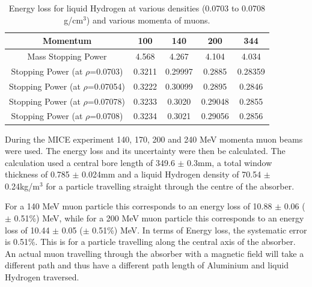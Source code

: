\begin{table}
  \caption{
    Energy loss for liquid Hydrogen at various densities (0.0703 to 0.0708 g/cm${}^{3}$) and various momenta of muons.
  }
  \label{tab:Hydrogen}
  \begin{center}
    \begin{tabular}{|c c c c c|}
    \hline

Momentum & 100 & 140 & 200 & 344     \rule{0pt}{14pt} \\
\hline
{Mass Stopping Power} & 4.568 & 4.267 & 4.104 & 4.034 \\
{Stopping Power }(at $\rho$=0.0703)\textbf{} & 0.3211 & 0.29997 & 0.2885 & 0.28359\\
{Stopping Power }(at $\rho$=0.07054)\textbf{} & 0.3222 & 0.30099 & 0.2895 & 0.2846 \\
{Stopping Power }(at $\rho$=0.07078)\textbf{} & 0.3233 & 0.3020 & 0.29048 & 0.2855 \\
{Stopping Power }(at $\rho$=0.0708)\textbf{} & 0.3234 & 0.3021 & 0.29056 & 0.2856 \\
    \hline
    \end{tabular}
  \end{center}
\end{table} 


 During the MICE experiment 140, 170, 200 and 240 MeV momenta muon beams were used. The energy loss and its uncertainty were then be calculated. The calculation used a central bore length of 349.6 $\mathrm{\pm}$ 0.3mm, a total window thickness of 0.785 $\mathrm{\pm}$ 0.024mm and a liquid Hydrogen density of 70.54 $\mathrm{\pm}$ 0.24kg/m${}^{3}$ for a particle travelling straight through the centre of the absorber.

 For a 140 MeV muon particle this corresponds to an energy loss of 10.88 $\mathrm{\pm}$ 0.06 ($\mathrm{\pm}$ 0.51\%) MeV, while for a 200 MeV muon particle this corresponds to an energy loss of 10.44 $\mathrm{\pm}$ 0.05 ($\mathrm{\pm}$ 0.51\%) MeV. In terms of Energy loss, the systematic error is 0.51\%. This is for a particle travelling along the central axis of the absorber. An actual muon travelling through the absorber with a magnetic field will take a different path and thus have a different path length of Aluminium and liquid Hydrogen traversed.
 
 


